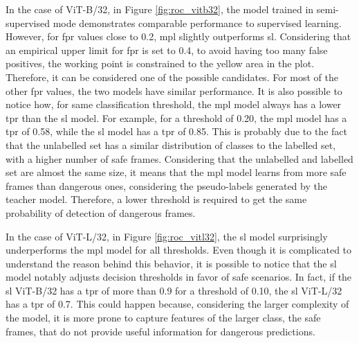 In the case of ViT-B/32, in Figure \ref{fig:roc_vitb32}, the model trained in 
semi-supervised mode demonstrates comparable performance to supervised learning.
However, for \acs{fpr} values close to 0.2, \acs{mpl} slightly outperforms \acs{sl}.
Considering that an empirical upper limit for \acs{fpr} is set to 0.4, to avoid 
having too many false positives, the working point is constrained to the yellow 
area in the plot. Therefore, it can be considered one of the possible candidates.
For most of the other \acs{fpr} values, the two models have similar performance.
It is also possible to notice how, for same classification threshold, the \acs{mpl} 
model always has a lower \acs{tpr} than the \acs{sl} model.
For example, for a threshold of 0.20, the \acs{mpl} model has a \acs{tpr} of 0.58, 
while the \acs{sl} model has a \acs{tpr} of 0.85. This is probably due to the 
fact that the unlabelled set has a similar distribution of classes to the labelled 
set, with a higher number of safe frames. 
Considering that the unlabelled and labelled set are almost the same size, it 
means that the \acs{mpl} model learns from more safe frames than dangerous ones,
considering the pseudo-labels generated by the teacher model.
Therefore, a lower threshold is required to get the same probability of detection 
of dangerous frames.

In the case of ViT-L/32, in Figure \ref{fig:roc_vitl32}, the \acs{sl} model 
surprisingly underperforms the \acs{mpl} model for all thresholds. Even though 
it is complicated to understand the reason behind this behavior, it is possible 
to notice that the \acs{sl} model notably adjusts decision thresholds in favor 
of safe scenarios. In fact, if the \acs{sl} ViT-B/32 has a \acs{tpr} of more than 
0.9 for a threshold of 0.10, the \acs{sl} ViT-L/32 has a \acs{tpr} of 0.7. 
This could happen because, considering the larger complexity of the model, it 
is more prone to capture features of the larger class, the safe frames, that 
do not provide useful information for dangerous predictions.

